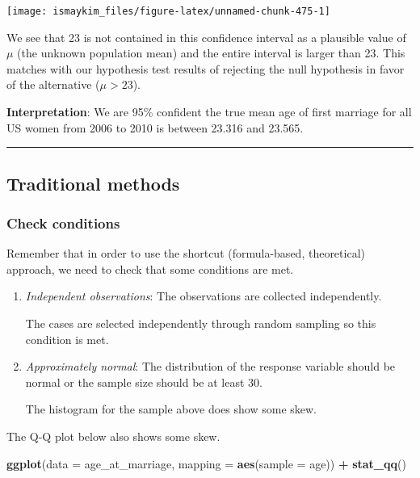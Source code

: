 \documentclass[12pt,]{krantz}
\makeatletter
\newenvironment{Shaded}{\begin{snugshade}}{\end{snugshade}}
\newcommand{\KeywordTok}[1]{\textcolor[rgb]{0.27,0.27,0.27}{\textbf{#1}}}
\newcommand{\DataTypeTok}[1]{\textcolor[rgb]{0.27,0.27,0.27}{#1}}
\newcommand{\StringTok}[1]{\textcolor[rgb]{0.5,0.5,0.5}{#1}}
\newcommand{\OperatorTok}[1]{\textcolor[rgb]{0.43,0.43,0.43}{\textbf{#1}}}
\newcommand{\NormalTok}[1]{#1}
\newenvironment{kframe}{%
\medskip{}
\setlength{\fboxsep}{.8em}
 \def\at@end@of@kframe{}%
 \ifinner\ifhmode%
  \def\at@end@of@kframe{\end{minipage}}%
  \begin{minipage}{\columnwidth}%
 \fi\fi%
 \def\FrameCommand##1{\hskip\@totalleftmargin \hskip-\fboxsep
 \colorbox{shadecolor}{##1}\hskip-\fboxsep
     \hskip-\linewidth \hskip-\@totalleftmargin \hskip\columnwidth}%
 \MakeFramed {\advance\hsize-\width
   \@totalleftmargin\z@ \linewidth\hsize
   \@setminipage}}%
 {\par\unskip\endMakeFramed%
 \at@end@of@kframe}
\renewenvironment{Shaded}{\begin{kframe}}{\end{kframe}}
\theoremstyle{definition}
\theoremstyle{definition}
\theoremstyle{definition}
\theoremstyle{remark}
\makeatother
\begin{document}
\begin{center}\texttt{[image: ismaykim\_files/figure-latex/unnamed-chunk-475-1]} \end{center}

We see that 23 is not contained in this confidence interval as a
plausible value of \(\mu\) (the unknown population mean) and the entire
interval is larger than 23. This matches with our hypothesis test
results of rejecting the null hypothesis in favor of the alternative
(\(\mu > 23\)).

\textbf{Interpretation}: We are 95\% confident the true mean age of
first marriage for all US women from 2006 to 2010 is between 23.316 and
23.565.

\begin{center}\rule{0.5\linewidth}{\linethickness}\end{center}

\subsection{Traditional methods}\label{traditional-methods}

\subsubsection*{Check conditions}\label{check-conditions}


Remember that in order to use the shortcut (formula-based, theoretical)
approach, we need to check that some conditions are met.

\begin{enumerate}
\def\labelenumi{\arabic{enumi}.}
\item
  \emph{Independent observations}: The observations are collected
  independently.

  The cases are selected independently through random sampling so this
  condition is met.
\item
  \emph{Approximately normal}: The distribution of the response variable
  should be normal or the sample size should be at least 30.

  The histogram for the sample above does show some skew.
\end{enumerate}

The Q-Q plot below also shows some skew.

\begin{Shaded}
\begin{Highlighting}[]
\KeywordTok{ggplot}\NormalTok{(}\DataTypeTok{data =}\NormalTok{ age_at_marriage, }\DataTypeTok{mapping =} \KeywordTok{aes}\NormalTok{(}\DataTypeTok{sample =}\NormalTok{ age)) }\OperatorTok{+}
\StringTok{  }\KeywordTok{stat_qq}\NormalTok{()}
\end{Highlighting}
\end{Shaded}
\end{document}
